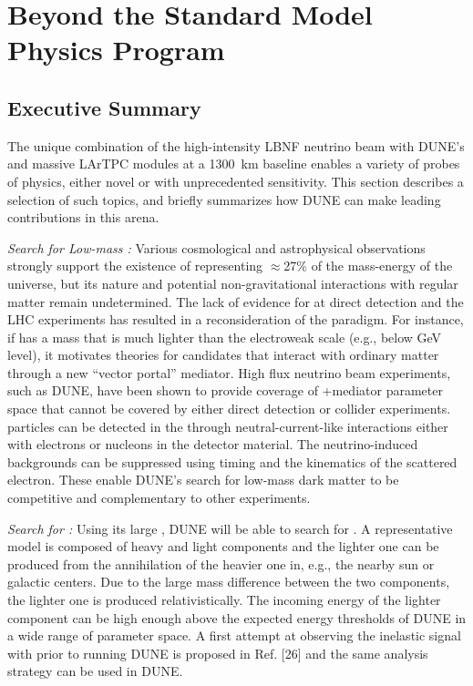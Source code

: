 \chapter{Beyond the Standard Model  Physics Program }
\label{ch:bsm}
\section{Executive Summary}
\label{phys:bsm:execsumm}

The unique combination of the high-intensity LBNF neutrino beam with DUNE's   and massive LArTPC  modules at a \SI{1300}{km} baseline enables a variety of probes of  physics, either novel or with unprecedented sensitivity. This section describes a selection of such topics, and briefly summarizes how DUNE can make leading contributions in this arena.


\textit{Search for Low-mass :} Various cosmological and astrophysical observations strongly support the existence of  representing $\approx$27\% of the mass-energy of the universe, but its nature and potential non-gravitational interactions with regular matter remain undetermined. The lack of evidence for  at direct detection and the LHC experiments has resulted in a reconsideration of the  paradigm. For instance, if  has a mass that is much lighter than the electroweak scale (e.g., below GeV level), it motivates theories for  candidates that interact with ordinary matter through a new ``vector portal'' mediator. High flux neutrino beam experiments, such as DUNE, have been shown to provide coverage of +mediator parameter space that cannot be covered by either direct detection or collider experiments.  particles can be detected in the   through neutral-current-like interactions either with electrons or nucleons in the detector material. The neutrino-induced backgrounds can be suppressed using timing and the kinematics of the scattered electron. These enable DUNE's search for low-mass dark matter to be competitive and complementary to other experiments.

\textit{Search for :} Using its large , DUNE will be able to search for . A representative model is composed of heavy and light  components and the lighter one can be produced from the annihilation of the heavier one in, e.g., the nearby sun or galactic centers. Due to the large mass difference between the two   components, the lighter one is produced relativistically. The incoming energy of the lighter  component can be high enough above the expected energy thresholds of DUNE in a wide range of parameter space. A first attempt at observing the inelastic  signal with  prior to running DUNE is proposed in Ref. [26]  and the same analysis strategy can be used in DUNE.

